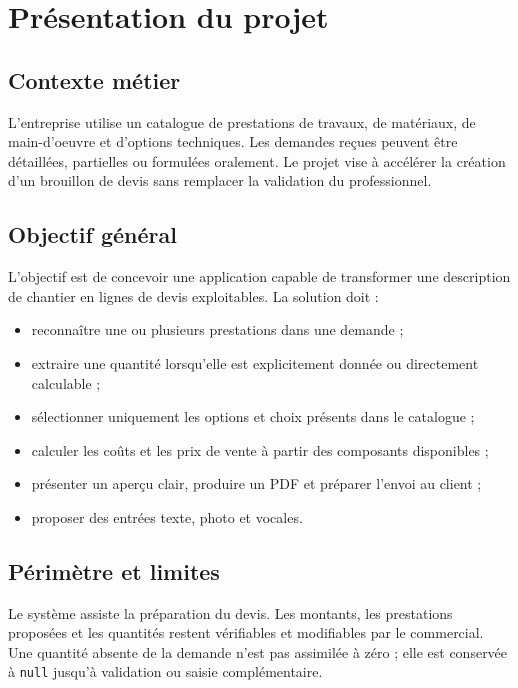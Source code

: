 \section{Présentation du projet}
\subsection{Contexte métier}
L'entreprise utilise un catalogue de prestations de travaux, de matériaux, de main-d'oeuvre et d'options techniques. Les demandes reçues peuvent être détaillées, partielles ou formulées oralement. Le projet vise à accélérer la création d'un brouillon de devis sans remplacer la validation du professionnel.

\subsection{Objectif général}
L'objectif est de concevoir une application capable de transformer une description de chantier en lignes de devis exploitables. La solution doit :
\begin{itemize}
\item reconnaître une ou plusieurs prestations dans une demande ;
\item extraire une quantité lorsqu'elle est explicitement donnée ou directement calculable ;
\item sélectionner uniquement les options et choix présents dans le catalogue ;
\item calculer les coûts et les prix de vente à partir des composants disponibles ;
\item présenter un aperçu clair, produire un PDF et préparer l'envoi au client ;
\item proposer des entrées texte, photo et vocales.
\end{itemize}

\subsection{Périmètre et limites}
Le système assiste la préparation du devis. Les montants, les prestations proposées et les quantités restent vérifiables et modifiables par le commercial. Une quantité absente de la demande n'est pas assimilée à zéro ; elle est conservée à \texttt{null} jusqu'à validation ou saisie complémentaire.
